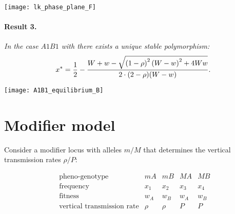 \documentclass[a0,landscape]{a0poster}
\begin{document}
\begin{multicols}{4}
\begin{center}\vspace{1cm}
\texttt{[image: lk\_phase\_plane\_F]}
\end{center}\vspace{1cm}

\paragraph*{Result 3.}\textit{In the case $A1B1$ with there exists a unique stable polymorphism:
\begin{equation}
x^* ={1\over 2} -{W+w-\sqrt{\left(1-\rho\right)^2\left(W-w\right)^2 +4Ww}\over 2\cdot(2-\rho)(W-w)}.
\end{equation}
}

\begin{center}\vspace{1cm}
\texttt{[image: A1B1\_equilibrium\_B]}
\end{center}\vspace{1cm}



\section*{Modifier model}

Consider a modifier locus with alleles $m/M$ that determines the vertical transmission rates $\rho/P$:

\begin{equation}
\begin{matrix}
 \text{ pheno-genotype}&mA&mB&MA&MB\\
 \text{ frequency}&x_1&x_2&x_3&x_4\\
 \text{ fitness}&w_A&w_B&w_A&w_B\\
 \text{ vertical transmission rate}&\rho&\rho&P&P\\
\end{matrix}
\end{equation} 


\end{multicols}
\end{document}

